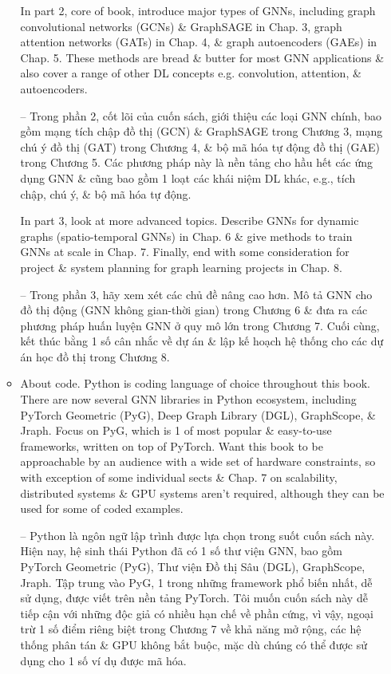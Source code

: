 \documentclass{article}
\begin{document}
\begin{itemize}
\begin{itemize}
        In part 2, core of book, introduce major types of GNNs, including graph convolutional networks (GCNs) \& GraphSAGE in Chap. 3, graph attention networks (GATs) in Chap. 4, \& graph autoencoders (GAEs) in Chap. 5. These methods are bread \& butter for most GNN applications \& also cover a range of other DL concepts e.g. convolution, attention, \& autoencoders.

        -- Trong phần 2, cốt lõi của cuốn sách, giới thiệu các loại GNN chính, bao gồm mạng tích chập đồ thị (GCN) \& GraphSAGE trong Chương 3, mạng chú ý đồ thị (GAT) trong Chương 4, \& bộ mã hóa tự động đồ thị (GAE) trong Chương 5. Các phương pháp này là nền tảng cho hầu hết các ứng dụng GNN \& cũng bao gồm 1 loạt các khái niệm DL khác, e.g., tích chập, chú ý, \& bộ mã hóa tự động.

        In part 3, look at more advanced topics. Describe GNNs for dynamic graphs (spatio-temporal GNNs) in Chap. 6 \& give methods to train GNNs at scale in Chap. 7. Finally, end with some consideration for project \& system planning for graph learning projects in Chap. 8.

        -- Trong phần 3, hãy xem xét các chủ đề nâng cao hơn. Mô tả GNN cho đồ thị động (GNN không gian-thời gian) trong Chương 6 \& đưa ra các phương pháp huấn luyện GNN ở quy mô lớn trong Chương 7. Cuối cùng, kết thúc bằng 1 số cân nhắc về dự án \& lập kế hoạch hệ thống cho các dự án học đồ thị trong Chương 8.
        \item {\sf About code.} Python is coding language of choice throughout this book. There are now several GNN libraries in Python ecosystem, including PyTorch Geometric (PyG), Deep Graph Library (DGL), GraphScope, \& Jraph. Focus on PyG, which is 1 of most popular \& easy-to-use frameworks, written on top of PyTorch. Want this book to be approachable by an audience with a wide set of hardware constraints, so with exception of some individual sects \& Chap. 7 on scalability, distributed systems \& GPU systems aren't required, although they can be used for some of coded examples.

        -- Python là ngôn ngữ lập trình được lựa chọn trong suốt cuốn sách này. Hiện nay, hệ sinh thái Python đã có 1 số thư viện GNN, bao gồm PyTorch Geometric (PyG), Thư viện Đồ thị Sâu (DGL), GraphScope, Jraph. Tập trung vào PyG, 1 trong những framework phổ biến nhất, dễ sử dụng, được viết trên nền tảng PyTorch. Tôi muốn cuốn sách này dễ tiếp cận với những độc giả có nhiều hạn chế về phần cứng, vì vậy, ngoại trừ 1 số điểm riêng biệt trong Chương 7 về khả năng mở rộng, các hệ thống phân tán \& GPU không bắt buộc, mặc dù chúng có thể được sử dụng cho 1 số ví dụ được mã hóa.


\end{itemize}
\end{itemize}
\end{document}
